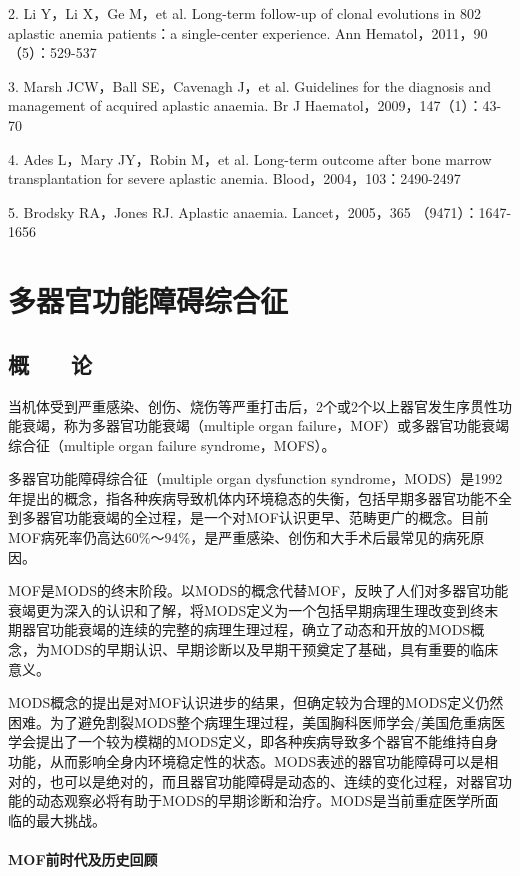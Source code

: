 2. Li Y，Li X，Ge M，et al. Long-term follow-up of clonal evolutions in
802 aplastic anemia patients：a single-center experience. Ann
Hematol，2011，90（5）：529-537

3. Marsh JCW，Ball SE，Cavenagh J，et al. Guidelines for the diagnosis
and management of acquired aplastic anaemia. Br J
Haematol，2009，147（1）：43-70

4. Ades L，Mary JY，Robin M，et al. Long-term outcome after bone marrow
transplantation for severe aplastic anemia. Blood，2004，103：2490-2497

5. Brodsky RA，Jones RJ. Aplastic anaemia. Lancet，2005，365
（9471）：1647-1656

\protect\hypertarget{text00092.html}{}{}

\chapter{多器官功能障碍综合征}

\section{概　　论}

当机体受到严重感染、创伤、烧伤等严重打击后，2个或2个以上器官发生序贯性功能衰竭，称为多器官功能衰竭（multiple
organ failure，MOF）或多器官功能衰竭综合征（multiple organ failure
syndrome，MOFS）。

多器官功能障碍综合征（multiple organ dysfunction
syndrome，MODS）是1992年提出的概念，指各种疾病导致机体内环境稳态的失衡，包括早期多器官功能不全到多器官功能衰竭的全过程，是一个对MOF认识更早、范畴更广的概念。目前MOF病死率仍高达60\%～94\%，是严重感染、创伤和大手术后最常见的病死原因。

MOF是MODS的终末阶段。以MODS的概念代替MOF，反映了人们对多器官功能衰竭更为深入的认识和了解，将MODS定义为一个包括早期病理生理改变到终末期器官功能衰竭的连续的完整的病理生理过程，确立了动态和开放的MODS概念，为MODS的早期认识、早期诊断以及早期干预奠定了基础，具有重要的临床意义。

MODS概念的提出是对MOF认识进步的结果，但确定较为合理的MODS定义仍然困难。为了避免割裂MODS整个病理生理过程，美国胸科医师学会/美国危重病医学会提出了一个较为模糊的MODS定义，即各种疾病导致多个器官不能维持自身功能，从而影响全身内环境稳定性的状态。MODS表述的器官功能障碍可以是相对的，也可以是绝对的，而且器官功能障碍是动态的、连续的变化过程，对器官功能的动态观察必将有助于MODS的早期诊断和治疗。MODS是当前重症医学所面临的最大挑战。

\subsubsection{MOF前时代及历史回顾}

